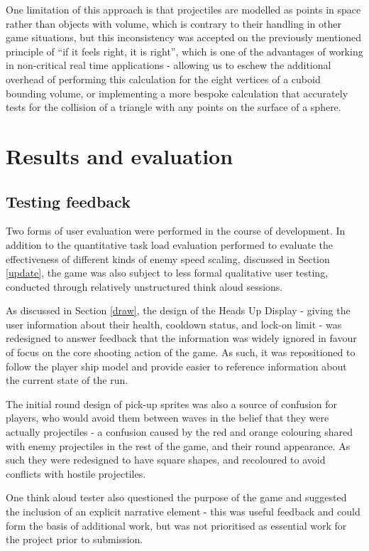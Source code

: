 \documentclass[11pt]{article}
\begin{document}
One limitation of this approach is that projectiles are modelled as points in space rather than
objects with volume, which is contrary to their handling in other game situations, but this
inconsistency was accepted on the previously mentioned principle of ``if it feels right, it is
right'', which is one of the advantages of working in non-critical real time applications -
allowing us to eschew the additional overhead of performing this calculation for the eight vertices
of a cuboid bounding volume, or implementing a more bespoke calculation that accurately tests for
the collision of a triangle with any points on the surface of a sphere.

\section{Results and evaluation}

\subsection{Testing feedback}
Two forms of user evaluation were performed in the course of development. In addition to the
quantitative task load evaluation performed to evaluate the effectiveness of different kinds
of enemy speed scaling, discussed in Section \ref{update}, the game was also subject to
less formal qualitative user testing, conducted through relatively unstructured think aloud sessions.

As discussed in Section \ref{draw}, the design of the Heads Up Display - giving the user information
about their health, cooldown status, and lock-on limit - was redesigned to answer feedback that
the information was widely ignored in favour of focus on the core shooting action of the game. As
such, it was repositioned to follow the player ship model and provide easier to reference information
about the current state of the run.

The initial round design of pick-up sprites was also a source of confusion for players, who would
avoid them between waves in the belief that they were actually projectiles - a confusion caused by
the red and orange colouring shared with enemy projectiles in the rest of the game, and their round
appearance. As such they were redesigned to have square shapes, and recoloured to avoid conflicts with
hostile projectiles.

One think aloud tester also questioned the purpose of the game and suggested the inclusion of an explicit
narrative element - this was useful feedback and could form the basis of additional work, but was not
prioritised as essential work for the project prior to submission.
\end{document}
